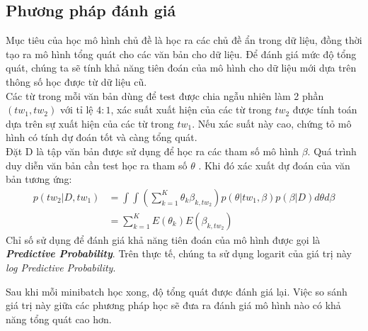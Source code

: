 \documentclass[fontsize=13pt]{scrartcl}
\begin{document}
\subsection{Phương pháp đánh giá }
Mục tiêu của học mô hình chủ đề là học ra các chủ đề ẩn trong dữ liệu, đồng thời tạo ra mô hình tổng quát cho các văn bản cho dữ liệu. Để đánh giá mức độ tổng quát, chúng ta sẽ tính khả năng tiên đoán của mô hình cho dữ liệu mới dựa trên thông số học được từ dữ liệu cũ.\\
Các từ trong mỗi văn bản dùng để test được chia ngẫu nhiên làm 2 phần $(tw_1,tw_2)$ với tỉ lệ $4:1$, xác suất xuất hiện của các từ trong $tw_2$ được tính toán dựa trên sự xuất hiện của các từ trong $tw_1$. Nếu xác suất này cao, chứng tỏ mô hình có tính dự đoán tốt và càng tổng quát.\\
Đặt D là tập văn bản được sử dụng để học ra các tham số mô hình $\beta$. Quá trình duy diễn văn bản cần test học ra tham số $\theta$ . Khi đó xác xuất dự đoán của văn bản tương ứng:
\begin{align}
p(tw_2 | D, tw_1) &= \int \int (\sum_{k=1}^{K} \theta_{k}\beta_{k,tw_2})p(\theta | tw_1,\beta)p(\beta|D)d\theta d\beta\\
&= \sum_{k=1}^{K}E(\theta_{k})E(\beta_{k,tw_2})
\end{align}
Chỉ số sử dụng để đánh giá khả năng tiên đoán của mô hình được gọi là \textbf\textit{Predictive Probability}. Trên thực tế, chúng ta sử dụng logarit của giá trị này \textit{log Predictive Probability}.
\par
Sau khi mỗi minibatch học xong, độ tổng quát được đánh giá lại. Việc so sánh giá trị này giữa các phương pháp học sẽ đưa ra đánh giá mô hình nào có khả năng tổng quát cao hơn.
\end{document}
